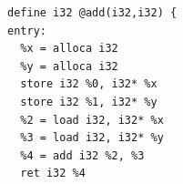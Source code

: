 \documentclass{jarticle}
\begin{document}
\begin{Verbatim}
define i32 @add(i32,i32) {
entry:
  %x = alloca i32
  %y = alloca i32
  store i32 %0, i32* %x
  store i32 %1, i32* %y
  %2 = load i32, i32* %x
  %3 = load i32, i32* %y
  %4 = add i32 %2, %3
  ret i32 %4
\end{Verbatim}
\end{document}
